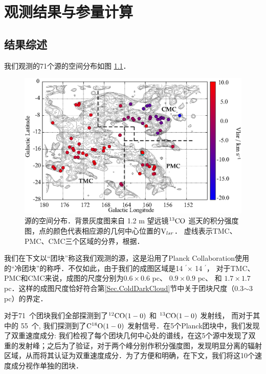 \documentclass[UTF8, nocolorlinks]{pkuthss}
\newcommand{\cob}{$\rm ^{13}CO$ }
\newcommand{\coaa}{$\rm^{12}CO(1-0)$ }
\newcommand{\cobb}{$\rm^{13}CO(1-0)$ }
\newcommand{\cocc}{$\rm C^{18}O(1-0)$ }
\newcommand{\vlsr}{${\rm V } _{lsr}$}
\newcommand{\arcmin}{$^{\prime}$}
\newcommand{\numsou}{71\ }
\newcommand{\numcocc}{55\ }
\begin{document}
\chapter{观测结果与参量计算}

	\section{结果综述}

		我们观测的71个源的空间分布如图 \ref{Fig.SpatialDistribution}．

		\begin{figure}[H]
			\centering
			\includegraphics[totalheight=82mm]{img_plot/SpatiaDist_Velocity_Overlay.eps}
			\caption{源的空间分布．背景灰度图来自 1.2 m 望远镜\cob 巡天的积分强度图\supercite{2001ApJ...547..792D}，点的颜色代表相应源的几何中心位置的\vlsr ．
			虚线表示TMC、PMC、CMC三个区域的分界，根据\parencite{2010A&A...512A..67L}．
			\label{Fig.SpatialDistribution}}
		\end{figure}

		我们在下文以“团块”称这我们观测的源，这是沿用了Planck Collaboration使用的“冷团块”的称呼\supercite{2011A&A...536A..23P}．不仅如此，由于我们的成图区域是14 \arcmin $\times$ 14 \arcmin ， 对于TMC、PMC和CMC来说，成图的尺度分别为$0.6\times0.6$ pc、 $0.9\times0.9$ pc、 和 $1.7\times1.7$ pc．这样的成图尺度恰好符合第\ref{Sec.ColdDarkCloud}节中关于团块尺度（0.3$\sim$3 pc）的界定．

		对于\numsou 个团块我们全部探测到了\coaa  和 \cobb 发射线， 而对于其中的 \numcocc 个, 我们探测到了\cocc 发射信号．在5个Planck团块中，我们发现了双重速度成分: 我们检视了每个团块几何中心处的谱线，在这5个源中发现了双重的发射峰；之后为了验证，对于两个峰分别作积分强度图，发现明显分离的辐射区域，从而将其认证为双重速度成分．为了方便和明确，在下文，我们将这10个速度成分视作单独的团块．
	
\end{document}
